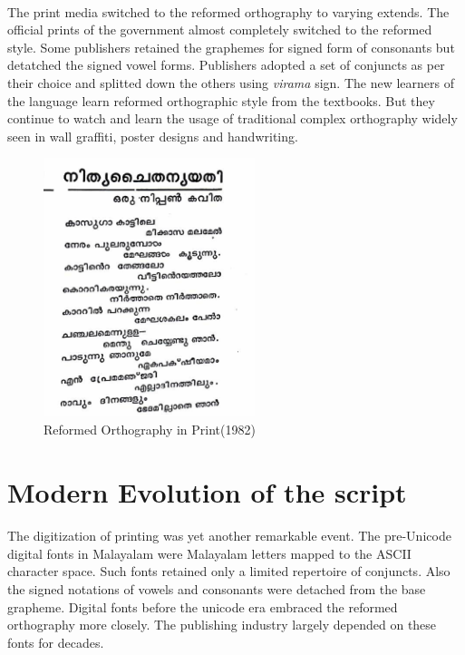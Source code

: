 \documentclass[10pt]{article}
\begin{document}
\paragraph{}
The print media switched to the reformed orthography to varying extends. The official prints of the government almost completely switched to the reformed style. Some publishers retained the graphemes for signed form of consonants but detatched the signed vowel forms. Publishers adopted a set of conjuncts as per their choice and splitted down the others using \textit{virama} sign. The new learners of the language learn reformed orthographic style from the textbooks. But they continue to watch and learn the usage of traditional complex orthography widely seen in wall graffiti, poster designs and handwriting.

\begin{figure}[h!]
	\centering
	\includegraphics[width=0.55\textwidth]{images/reformed_text.jpg}
	\caption{Reformed Orthography in Print(1982)}
	\label{Samkshepam}
\end{figure}

\section{Modern Evolution of the script}
\paragraph{}
The digitization of printing was yet another remarkable event. The pre-Unicode digital fonts in Malayalam were Malayalam letters mapped to the ASCII character space. Such fonts retained only a limited repertoire of conjuncts. Also the signed notations of vowels and consonants were detached from the base grapheme. Digital fonts before the unicode era embraced the reformed orthography more closely. The publishing industry largely depended on these fonts for decades.
\end{document}
